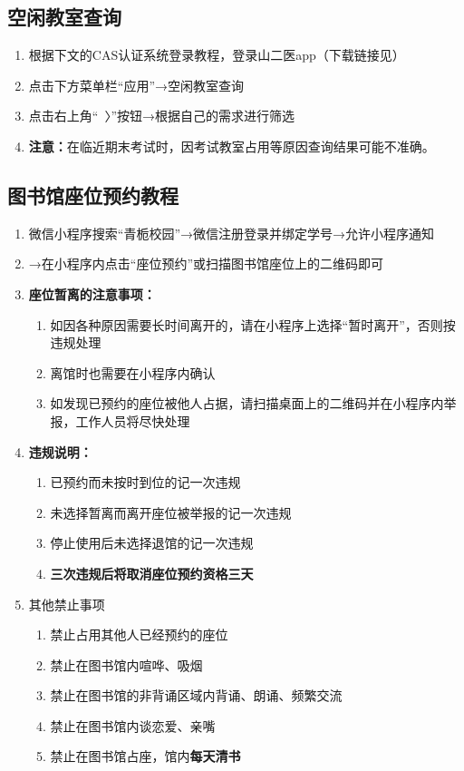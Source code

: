 \subsection[空闲教室查询]{空闲教室查询}
\label{spare_classroom}
\begin{enumerate}
    \item 根据下文的CAS认证系统登录教程，登录山二医app（下载链接见）
    \item 点击下方菜单栏“应用”→空闲教室查询
    \item 点击右上角“\ 〉”按钮→根据自己的需求进行筛选
    \item \textbf{注意：}在临近期末考试时，因考试教室占用等原因查询结果可能不准确。
\end{enumerate}

\subsection[图书馆座位预约教程]{图书馆座位预约教程}
\label{library_book}
\begin{enumerate}
    \item 微信小程序搜索“青栀校园”→微信注册登录并绑定学号→允许小程序通知
    \item →在小程序内点击“座位预约”或扫描图书馆座位上的二维码即可
    \item \textbf{座位暂离的注意事项：}
          \begin{enumerate}
              \item 如因各种原因需要长时间离开的，请在小程序上选择“暂时离开”，否则按违规处理
              \item 离馆时也需要在小程序内确认
              \item 如发现已预约的座位被他人占据，请扫描桌面上的二维码并在小程序内举报，工作人员将尽快处理
          \end{enumerate}
    \item \textbf{违规说明：}
          \begin{enumerate}
              \item 已预约而未按时到位的记一次违规
              \item 未选择暂离而离开座位被举报的记一次违规
              \item 停止使用后未选择退馆的记一次违规
              \item \textbf{三次违规后将取消座位预约资格三天}
          \end{enumerate}
    \item 其他禁止事项
          \begin{enumerate}
              \item 禁止占用其他人已经预约的座位
              \item 禁止在图书馆内喧哗、吸烟
              \item 禁止在图书馆的非背诵区域内背诵、朗诵、频繁交流
              \item 禁止在图书馆内谈恋爱、亲嘴
              \item 禁止在图书馆占座，馆内\textbf{每天清书}
          \end{enumerate}
\end{enumerate}

